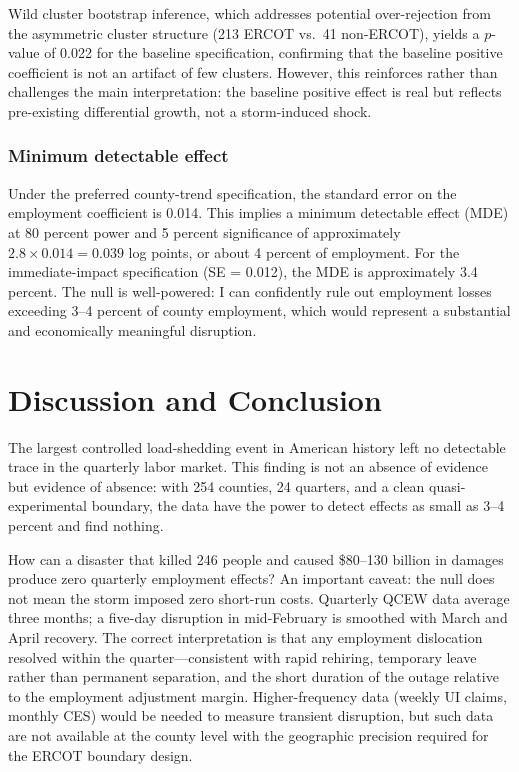 \documentclass[12pt]{article}
\begin{document}
Wild cluster bootstrap inference, which addresses potential over-rejection from the asymmetric cluster structure (213 ERCOT vs.\ 41 non-ERCOT), yields a $p$-value of 0.022 for the baseline specification, confirming that the baseline positive coefficient is not an artifact of few clusters. However, this reinforces rather than challenges the main interpretation: the baseline positive effect is real but reflects pre-existing differential growth, not a storm-induced shock.

\subsubsection*{Minimum detectable effect} Under the preferred county-trend specification, the standard error on the employment coefficient is 0.014. This implies a minimum detectable effect (MDE) at 80 percent power and 5 percent significance of approximately $2.8 \times 0.014 = 0.039$ log points, or about 4 percent of employment. For the immediate-impact specification (SE = 0.012), the MDE is approximately 3.4 percent. The null is well-powered: I can confidently rule out employment losses exceeding 3--4 percent of county employment, which would represent a substantial and economically meaningful disruption.


\section{Discussion and Conclusion}

The largest controlled load-shedding event in American history left no detectable trace in the quarterly labor market. This finding is not an absence of evidence but evidence of absence: with 254 counties, 24 quarters, and a clean quasi-experimental boundary, the data have the power to detect effects as small as 3--4 percent and find nothing.

How can a disaster that killed 246 people and caused \$80--130 billion in damages produce zero quarterly employment effects? An important caveat: the null does not mean the storm imposed zero short-run costs. Quarterly QCEW data average three months; a five-day disruption in mid-February is smoothed with March and April recovery. The correct interpretation is that any employment dislocation resolved within the quarter---consistent with rapid rehiring, temporary leave rather than permanent separation, and the short duration of the outage relative to the employment adjustment margin. Higher-frequency data (weekly UI claims, monthly CES) would be needed to measure transient disruption, but such data are not available at the county level with the geographic precision required for the ERCOT boundary design.
\end{document}
